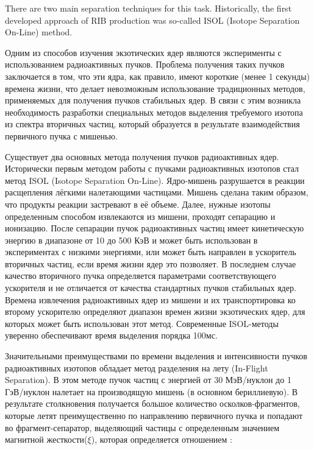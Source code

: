 There are two main separation techniques for this task.
Historically, the first developed approach of RIB production was so-called ISOL (Isotope Separation On-Line) method. 




\newpage

Одним из способов изучения экзотических ядер являются эксперименты с использованием радиоактивных пучков. Проблема получения таких пучков заключается в том, что эти ядра, как правило,  имеют короткие (менее 1 секунды) времена жизни, что делает невозможным использование традиционных методов, применяемых для получения пучков стабильных ядер. В связи с этим возникла необходимость разработки специальных методов выделения требуемого изотопа из спектра вторичных частиц, который образуется в результате взаимодействия первичного пучка с мишенью.

Существует два основных метода получения пучков радиоактивных ядер.
Исторически первым методом работы с пучками радиоактивных изотопов стал метод ISOL (Isotope Separation On-Line)\cite{ufn}. Ядро-мишень разрушается в реакции расщепления лёгкими налетающими частицами. Мишень сделана таким образом, что продукты реакции застревают в её объеме. Далее, нужные изотопы определенным способом извлекаются из мишени, проходят сепарацию и ионизацию. После сепарации пучок радиоактивных частиц имеет кинетическую энергию в диапазоне от 10 до 500 КэВ и может быть использован в экспериментах с низкими энергиями, или может быть направлен в ускоритель вторичных частиц, если время жизни ядер это позволяет. В последнем случае качество вторичного пучка определяется параметрами соответствующего ускорителя и не отличается от качества стандартных пучков стабильных ядер. Времена извлечения радиоактивных ядер из мишени и их транспортировка ко второму ускорителю определяют диапазон времен жизни экзотических ядер, для которых может быть использован этот метод. Современные ISOL-методы уверенно обеспечивают время выделения порядка 100мс\cite{ufn}. 

Значительными преимуществами по времени выделения и интенсивности пучков радиоактивных изотопов обладает метод разделения на лету (In-Flight Separation). В этом методе пучок частиц с энергией от 30 МэВ/нуклон до 1 ГэВ/нуклон налетает на производящую мишень (в основном бериллиевую). В результате столкновения получается большое количество осколков-фрагментов, которые летят преимущественно по направлению первичного пучка и попадают во фрагмент-сепаратор, выделяющий частицы с определенным значением магнитной жесткости($\xi$), которая определяется отношением :

